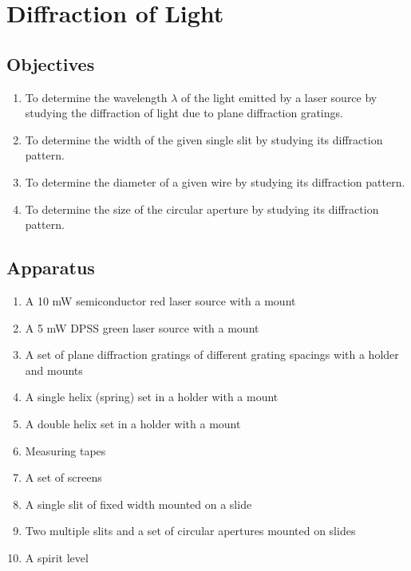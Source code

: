 
\chapter{Diffraction of Light}

\section*{Objectives}

\begin{enumerate}
    \item To determine the wavelength $\lambda$ of the light emitted by a laser source by studying the diffraction of light due to plane diffraction gratings.
    \item To determine the width of the given single slit by studying its diffraction pattern.
    \item To determine the diameter of a given wire by studying its diffraction pattern.
    \item To determine the size of the circular aperture by studying its diffraction pattern.
\end{enumerate}



\section*{Apparatus}

\begin{enumerate}
    \item A 10 mW semiconductor red laser source with a mount
    \item A 5 mW DPSS green laser source with a mount
    \item A set of plane diffraction gratings of different grating spacings with a holder and mounts
    \item A single helix (spring) set in a holder with a mount
    \item A double helix set in a holder with a mount
    \item Measuring tapes
    \item A set of screens 
    \item A single slit of fixed width mounted on a slide
    \item Two multiple slits and a set of circular apertures mounted on slides
    \item A spirit level
\end{enumerate}

